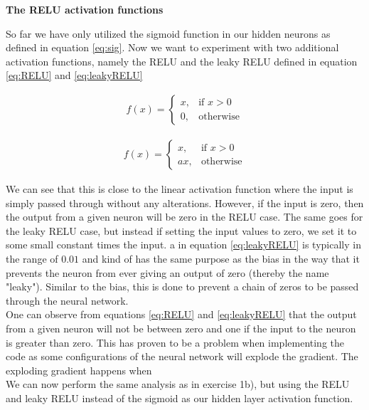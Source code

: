 \documentclass[12pt,a4paper]{article}
\begin{document}
\begin{center}
\large{\textbf{The RELU activation functions}}
\end{center}

\noindent So far we have only utilized the sigmoid function in our hidden neurons as defined in equation \ref{eq:sig}. Now we want to experiment with two additional activation functions, namely the RELU and the leaky RELU defined in equation \ref{eq:RELU} and \ref{eq:leakyRELU}

\begin{equation}\label{eq:RELU}
\begin{aligned}
f(x) = 
\begin{cases}
x,& \text{if } x > 0\\
0,& \text{otherwise}
\end{cases}
\end{aligned}
\end{equation}

\begin{equation}\label{eq:leakyRELU}
\begin{aligned}
f(x) = 
\begin{cases}
x,& \text{if } x > 0\\
ax,& \text{otherwise}
\end{cases}
\end{aligned}
\end{equation}

\noindent We can see that this is close to the linear activation function where the input is simply passed through without any alterations. However, if the input is zero, then the output from a given neuron will be zero in the RELU case. The same goes for the leaky RELU case, but instead if setting the input values to zero, we set it to some small constant times the input. a in equation \ref{eq:leakyRELU} is typically in the range of $0.01$ and kind of has the same purpose as the bias in the way that it prevents the neuron from ever giving an output of zero (thereby the name "leaky"). Similar to the bias, this is done to prevent a chain of zeros to be passed through the neural network.
\\
One can observe from equations \ref{eq:RELU} and \ref{eq:leakyRELU} that the output from a given neuron will not be between zero and one if the input to the neuron is greater than zero. This has proven to be a problem when implementing the code as some configurations of the neural network will explode the gradient. The exploding gradient happens when 
\\
We can now perform the same analysis as in exercise 1b), but using the RELU and leaky RELU instead of the sigmoid as our hidden layer activation function.
\end{document}
